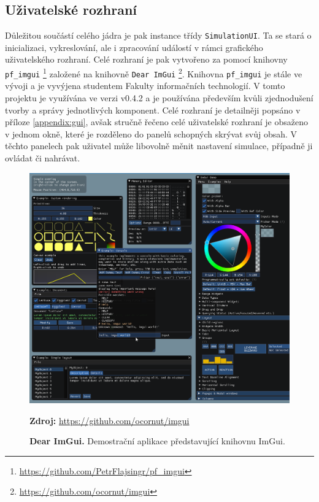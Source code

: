 \subsection{Uživatelské rozhraní}
\label{chapter:uzivRozh}

Důležitou součástí celého jádra je pak instance třídy \texttt{SimulationUI}. Ta se stará o inicializaci, vykreslování, ale i zpracování událostí v rámci grafického uživatelského rozhraní. Celé rozhraní je pak vytvořeno za pomocí knihovny \texttt{pf\_imgui} \footnote{\url{https://github.com/PetrFlajsingr/pf_imgui}} založené na knihovně \texttt{Dear ImGui} \footnote{\url{https://github.com/ocornut/imgui}}. Knihovna \texttt{pf\_imgui} je stále ve vývoji a je vyvýjena studentem Fakulty informačních technologií. V tomto projektu je využívána ve verzi v0.4.2 a je používána především kvůli zjednodušení tvorby a správy jednotlivých komponent. Celé rozhraní je detailněji popsáno v příloze \ref{appendix:gui}, avšak stručně řečeno celé uživatelské rozhraní je obsaženo v jednom okně, které je rozděleno do panelů schopných skrývat svůj obsah. V těchto panelech pak uživatel může libovolně měnit nastavení simulace, případně ji ovládat či nahrávat.

\begin{figure}[hbt]
	\centering
	\captionsetup{justification=centering}
	\includegraphics[scale=0.2]{obrazky-figures/imgui.png}
	\caption{\textbf{Dear ImGui.} Demostrační aplikace představující knihovnu ImGui.}
	\textbf{Zdroj: } \url{https://github.com/ocornut/imgui}
	\label{fig:structsEvap}
\end{figure}

